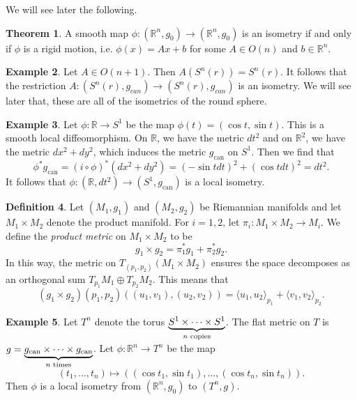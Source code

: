 \documentclass{amsart}
\numberwithin{equation}{section}
\newcommand{\bR}{\mathbb{R}}
\theoremstyle{definition}
\newtheorem{definition}{Definition} [section]
\newtheorem{example}[definition]{Example}
\theoremstyle{theorem}
\newtheorem{theorem}[definition]{Theorem}
\begin{document}
We will see later the following.
\begin{theorem}
A smooth map $\phi : (\mathbb{R}^n, g_0) \to (\mathbb{R}^n, g_0)$ is an isometry 
if and only if $\phi$ is a rigid motion, i.e. $\phi(x) = Ax + b$ 
for some $A \in O(n)$ and $b \in \bR^n$. 
\end{theorem}

\begin{example}
Let $A \in O(n+1)$. Then $A(S^n(r)) = S^n(r)$. It follows that the restriction $A : (S^n(r), g_{can}) \to (S^n(r), g_{can})$ is an isometry. 
We will see later that, these are all of the isometrics of the round sphere.
\end{example}

\begin{example}
Let $\phi : \bR \to S^1$ be the map $\phi(t) = (\cos t, \sin t)$. This is a smooth local diffeomorphism. On $\bR$, we have the metric $dt^2$ and on $\bR^2$, we have the metric $dx^2 + dy^2$, which induces the metric $g_\mathrm{can}$ on $S^1$. Then we find that 
\[
\phi^* g_\mathrm{can} = (i\circ \phi)^*(dx^2 + dy^2) 
=  (-\sin t dt)^2 + (\cos t dt)^2 = dt^2.
\]
It follows that $\phi: (\bR, dt^2)\to (S^1,g_{\mathrm{can}})$ is a local isometry. 
\end{example}

\begin{definition}
Let $(M_1, g_1)$ and $(M_2, g_2)$ be Riemannian manifolds and let $M_1 \times M_2$ denote the product manifold. For $i=1, 2$, let $\pi_i : M_1 \times M_2 \to M_i$. We define the 
{\em product metric} on $M_1 \times M_2$ to be 
\[
g_1 \times g_2 = \pi_1^*g_1 + \pi_2^*g_2. 
\]
In this way, the metric on $T_{(p_1, p_2)}(M_1 \times M_2)$ ensures the space decomposes as an orthogonal sum $T_{p_1}M_1 \oplus T_{p_2}M_2$. This means that 
\[
(g_1 \times g_2)(p_1, p_2)((u_1,v_1), (u_2, v_2)) = \langle u_1, u_2 \rangle_{p_1} + \langle v_1, v_2 \rangle_{p_2}.
\]
\end{definition}

\begin{example}
Let $T^n$ denote the torus $\underbrace{S^1 \times \cdots \times S^1}_{n\textup{ copies}}$.
The flat metric on $T$ is 
$g=\underbrace{g_{\mathrm{can}}\times \cdots\times g_{\mathrm{can}} }_{n \textup{ times}}$.
Let $\phi : \mathbb{R}^n \to T^n$ be the map 
\[
(t_1, \ldots, t_n) \mapsto ((\cos t_1, \sin t_1), \ldots, (\cos t_n, \sin t_n)).
\]
Then $\phi$ is a local isometry from $(\bR^n, g_0)$ to $(T^n,g)$. 
\end{example}
\end{document}

